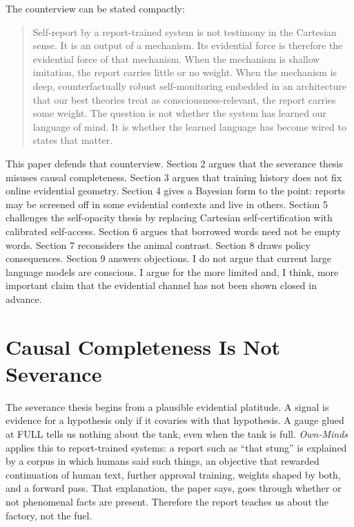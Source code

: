 \documentclass[11pt]{article}
\begin{document}
The counterview can be stated compactly:

\begin{quote}
Self-report by a report-trained system is not testimony in the Cartesian sense. It is an output of a mechanism. Its evidential force is therefore the evidential force of that mechanism. When the mechanism is shallow imitation, the report carries little or no weight. When the mechanism is deep, counterfactually robust self-monitoring embedded in an architecture that our best theories treat as consciousness-relevant, the report carries some weight. The question is not whether the system has learned our language of mind. It is whether the learned language has become wired to states that matter.
\end{quote}

This paper defends that counterview. Section 2 argues that the severance thesis misuses causal completeness. Section 3 argues that training history does not fix online evidential geometry. Section 4 gives a Bayesian form to the point: reports may be screened off in some evidential contexts and live in others. Section 5 challenges the self-opacity thesis by replacing Cartesian self-certification with calibrated self-access. Section 6 argues that borrowed words need not be empty words. Section 7 reconsiders the animal contrast. Section 8 draws policy consequences. Section 9 answers objections. I do not argue that current large language models are conscious. I argue for the more limited and, I think, more important claim that the evidential channel has not been shown closed in advance.

\section{Causal Completeness Is Not Severance}

The severance thesis begins from a plausible evidential platitude. A signal is evidence for a hypothesis only if it covaries with that hypothesis. A gauge glued at FULL tells us nothing about the tank, even when the tank is full. \textit{Own-Minds} applies this to report-trained systems: a report such as ``that stung'' is explained by a corpus in which humans said such things, an objective that rewarded continuation of human text, further approval training, weights shaped by both, and a forward pass. That explanation, the paper says, goes through whether or not phenomenal facts are present. Therefore the report teaches us about the factory, not the fuel.
\end{document}
